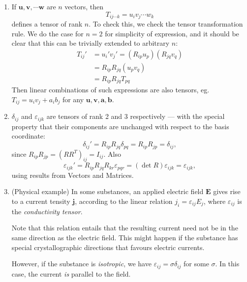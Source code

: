 \documentclass[a4paper]{article}
\begin{document}
\begin{eg}\leavevmode
  \begin{enumerate}
    \item If $\mathbf{u}, \mathbf{v}, \cdots\mathbf{w}$ are $n$ vectors, then
      \[
        T_{ij\cdots k} =u_i v_j \cdots w_k
      \]
      defines a tensor of rank $n$. To check this, we check the tensor transformation rule. We do the case for $n = 2$ for simplicity of expression, and it should be clear that this can be trivially extended to arbitrary $n$:
      \begin{align*}
        T_{ij}' &= u_i'v_j' = (R_{ip} u_p)(R_{jq}v_q)\\
        &= R_{ip}R_{jq}(u_p v_q)\\
        &= R_{ip}R_{jq}T_{pq}
      \end{align*}
      Then linear combinations of such expressions are also tensors, eg. $T_{ij} = u_i v_j + a_ib_j$ for any $\mathbf{u}, \mathbf{v}, \mathbf{a},\mathbf{b}$.
    \item $\delta_{ij}$ and $\varepsilon_{ijk}$ are tensors of rank 2 and 3 respectively --- with the special property that their components are unchanged with respect to the basis coordinate:
      \[
        \delta_{ij}' = R_{ip}R_{jq}\delta_{pq} = R_{ip}R_{jp} = \delta_{ij},
      \]
      since $R_{ip}R_{jp} = (RR^T)_{ij} = I_{ij}$. Also
      \[
        \varepsilon_{ijk}' = R_{ip}R_{jq}R_{kr}\varepsilon_{pqr} = (\det R)\varepsilon_{ijk} = \varepsilon_{ijk},
      \]
      using results from Vectors and Matrices.
    \item (Physical example) In some substances, an applied electric field $\mathbf{E}$ gives rise to a current tensity $\mathbf{j}$, according to the linear relation $j_i = \varepsilon_{ij} E_j$, where $\varepsilon_{ij}$ is the \emph{conductivity tensor}.

      Note that this relation entails that the resulting current need not be in the same direction as the electric field. This might happen if the substance has special crystallographic directions that favours electric currents.

      However, if the substance is \emph{isotropic}, we have $\varepsilon_{ij} = \sigma\delta_{ij}$ for some $\sigma$. In this case, the current \emph{is} parallel to the field.
  \end{enumerate}
\end{eg}
\end{document}
